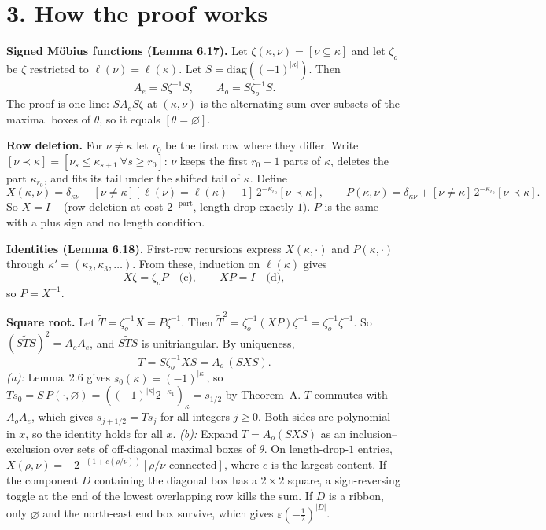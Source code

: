 \documentclass[11pt]{article}
\begin{document}
\section*{3. How the proof works}
\textbf{Signed M\"obius functions (Lemma 6.17).} Let $\zeta(\kappa,\nu)=[\nu\subseteq\kappa]$ and let $\zeta_o$ be
$\zeta$ restricted to $\ell(\nu)=\ell(\kappa)$. Let $S=\mathrm{diag}((-1)^{|\kappa|})$. Then
\[A_e=S\zeta^{-1}S,\qquad A_o=S\zeta_o^{-1}S.\]
The proof is one line: $SA_eS\zeta$ at $(\kappa,\nu)$ is the alternating sum over subsets of the maximal boxes of
$\theta$, so it equals $[\theta=\varnothing]$.

\textbf{Row deletion.} For $\nu\ne\kappa$ let $r_0$ be the first row where they differ. Write
$[\nu\prec\kappa]=[\nu_s\le\kappa_{s+1}\ \forall s\ge r_0]$: $\nu$ keeps the first $r_0-1$ parts of $\kappa$, deletes the
part $\kappa_{r_0}$, and fits its tail under the shifted tail of $\kappa$. Define
\[X(\kappa,\nu)=\delta_{\kappa\nu}-[\nu\ne\kappa][\ell(\nu)=\ell(\kappa)-1]\,2^{-\kappa_{r_0}}[\nu\prec\kappa],\qquad
P(\kappa,\nu)=\delta_{\kappa\nu}+[\nu\ne\kappa]\,2^{-\kappa_{r_0}}[\nu\prec\kappa].\]
So $X=I-{}$(row deletion at cost $2^{-\text{part}}$, length drop exactly $1$). $P$ is the same with a plus sign and no
length condition.

\textbf{Identities (Lemma 6.18).} First-row recursions express $X(\kappa,\cdot)$ and $P(\kappa,\cdot)$ through
$\kappa'=(\kappa_2,\kappa_3,\dots)$. From these, induction on $\ell(\kappa)$ gives
\[X\zeta=\zeta_oP\quad\text{(c)},\qquad XP=I\quad\text{(d)},\]
so $P=X^{-1}$.

\textbf{Square root.} Let $\tilde T=\zeta_o^{-1}X=P\zeta^{-1}$. Then $\tilde T^2=\zeta_o^{-1}(XP)\zeta^{-1}=\zeta_o^{-1}\zeta^{-1}$.
So $(S\tilde TS)^2=A_oA_e$, and $S\tilde TS$ is unitriangular. By uniqueness,
\[T=S\zeta_o^{-1}XS=A_o\,(SXS).\]
\emph{(a):} Lemma~2.6 gives $s_0(\kappa)=(-1)^{|\kappa|}$, so
$Ts_0=S\,P(\cdot,\varnothing)=((-1)^{|\kappa|}2^{-\kappa_1})_\kappa=s_{1/2}$ by Theorem~A. $T$ commutes with
$A_oA_e$, which gives $s_{j+1/2}=Ts_j$ for all integers $j\ge0$. Both sides are polynomial in $x$, so the identity
holds for all $x$.
\emph{(b):} Expand $T=A_o(SXS)$ as an inclusion--exclusion over sets of off-diagonal maximal boxes of $\theta$. On
length-drop-$1$ entries, $X(\rho,\nu)=-2^{-(1+c(\rho/\nu))}[\rho/\nu\text{ connected}]$, where $c$ is the largest
content. If the component $D$ containing the diagonal box has a $2\times2$ square, a sign-reversing toggle at the end
of the lowest overlapping row kills the sum. If $D$ is a ribbon, only $\varnothing$ and the north-east end box
survive, which gives $\varepsilon(-\tfrac12)^{|D|}$.
\end{document}
